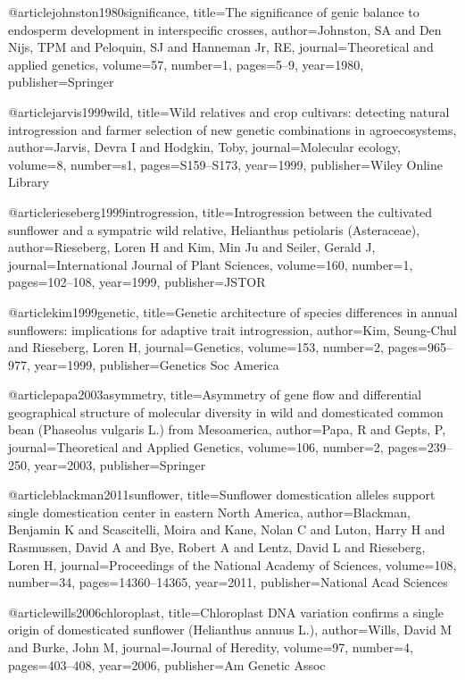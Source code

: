 @article{johnston1980significance,
  title={The significance of genic balance to endosperm development in interspecific crosses},
  author={Johnston, SA and Den Nijs, TPM and Peloquin, SJ and Hanneman Jr, RE},
  journal={Theoretical and applied genetics},
  volume={57},
  number={1},
  pages={5--9},
  year={1980},
  publisher={Springer}
}

@article{jarvis1999wild,
  title={Wild relatives and crop cultivars: detecting natural introgression and farmer selection of new genetic combinations in agroecosystems},
  author={Jarvis, Devra I and Hodgkin, Toby},
  journal={Molecular ecology},
  volume={8},
  number={s1},
  pages={S159--S173},
  year={1999},
  publisher={Wiley Online Library}
}

@article{rieseberg1999introgression,
  title={Introgression between the cultivated sunflower and a sympatric wild relative, Helianthus petiolaris (Asteraceae)},
  author={Rieseberg, Loren H and Kim, Min Ju and Seiler, Gerald J},
  journal={International Journal of Plant Sciences},
  volume={160},
  number={1},
  pages={102--108},
  year={1999},
  publisher={JSTOR}
}

@article{kim1999genetic,
  title={Genetic architecture of species differences in annual sunflowers: implications for adaptive trait introgression},
  author={Kim, Seung-Chul and Rieseberg, Loren H},
  journal={Genetics},
  volume={153},
  number={2},
  pages={965--977},
  year={1999},
  publisher={Genetics Soc America}
}

@article{papa2003asymmetry,
  title={Asymmetry of gene flow and differential geographical structure of molecular diversity in wild and domesticated common bean (Phaseolus vulgaris L.) from Mesoamerica},
  author={Papa, R and Gepts, P},
  journal={Theoretical and Applied Genetics},
  volume={106},
  number={2},
  pages={239--250},
  year={2003},
  publisher={Springer}
}

@article{blackman2011sunflower,
  title={Sunflower domestication alleles support single domestication center in eastern North America},
  author={Blackman, Benjamin K and Scascitelli, Moira and Kane, Nolan C and Luton, Harry H and Rasmussen, David A and Bye, Robert A and Lentz, David L and Rieseberg, Loren H},
  journal={Proceedings of the National Academy of Sciences},
  volume={108},
  number={34},
  pages={14360--14365},
  year={2011},
  publisher={National Acad Sciences}
}

@article{wills2006chloroplast,
  title={Chloroplast DNA variation confirms a single origin of domesticated sunflower (Helianthus annuus L.)},
  author={Wills, David M and Burke, John M},
  journal={Journal of Heredity},
  volume={97},
  number={4},
  pages={403--408},
  year={2006},
  publisher={Am Genetic Assoc}
}

